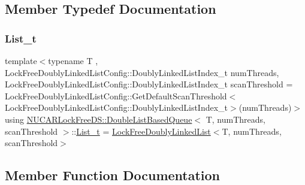 \subsection{Member Typedef Documentation}
\mbox{\label{class_n_u_c_a_r_lock_free_d_s_1_1_double_list_based_queue_adfcec8aa40c6690e45107405c2fa2c35}} 
\subsubsection{\texorpdfstring{List\+\_\+t}{List\_t}}
{\footnotesize\ttfamily template$<$typename T , Lock\+Free\+Doubly\+Linked\+List\+Config\+::\+Doubly\+Linked\+List\+Index\+\_\+t num\+Threads, Lock\+Free\+Doubly\+Linked\+List\+Config\+::\+Doubly\+Linked\+List\+Index\+\_\+t scan\+Threshold = Lock\+Free\+Doubly\+Linked\+List\+Config\+::\+Get\+Default\+Scan\+Threshold$<$\+Lock\+Free\+Doubly\+Linked\+List\+Config\+::\+Doubly\+Linked\+List\+Index\+\_\+t$>$(num\+Threads)$>$ \\
using \mbox{\hyperlink{class_n_u_c_a_r_lock_free_d_s_1_1_double_list_based_queue}{N\+U\+C\+A\+R\+Lock\+Free\+D\+S\+::\+Double\+List\+Based\+Queue}}$<$ T, num\+Threads, scan\+Threshold $>$\+::\mbox{\hyperlink{class_n_u_c_a_r_lock_free_d_s_1_1_double_list_based_queue_adfcec8aa40c6690e45107405c2fa2c35}{List\+\_\+t}} =  \mbox{\hyperlink{class_n_u_c_a_r_lock_free_d_s_1_1_lock_free_doubly_linked_list}{Lock\+Free\+Doubly\+Linked\+List}}$<$T, num\+Threads, scan\+Threshold$>$\hspace{0.3cm}{\ttfamily [private]}}



\subsection{Member Function Documentation}
\mbox{\label{class_n_u_c_a_r_lock_free_d_s_1_1_double_list_based_queue_a9541892be0892b41bc17a354586aa173}} 

